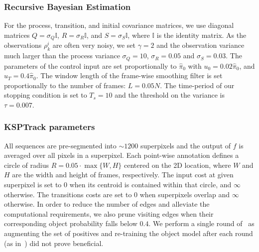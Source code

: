 \subsubsection{Recursive Bayesian Estimation}
For the process, transition, and initial covariance matrices, we use diagonal matrices 
$Q=\sigma_{Q}\mathbb{I}$, $R=\sigma_{R}\mathbb{I}$, and $S=\sigma_{S}\mathbb{I}$, where $\mathbb{I}$ is the identity matrix.
As the observations $\rho_{k}^{i}$ are often very noisy, we set $\gamma=2$ and the observation variance much larger than the process variance $\sigma_{Q}=10$, $\sigma_{R}=0.05$ and $\sigma_{S}=0.03$.
The parameters of the control input are set proportionally to $\hat \pi_{0}$ with $u_{0}=0.02 \hat \pi_{0}$, and $u_{T}=0.4 \hat \pi_{0}$. The window length of the frame-wise smoothing filter is set proportionally to the number of frames: $L=0.05N$. The time-period of our stopping condition is set to $T_{s}=10$ and the threshold on the variance is $\tau=0.007$.

\subsubsection{KSPTrack parameters}
\label{sec:org4560526}
All sequences are pre-segmented into $\sim 1200$ superpixels and the output of $f$ is averaged over all pixels in a superpixel. Each point-wise annotation defines a circle of radius \(R=0.05 \cdot \max\{W,H\}\) centered on the 2D location, where \(W\) and \(H\) are the width and height of frames, respectively. The input cost at given superpixel is set to $0$ when its centroid is contained within that circle, and $\infty$ otherwise. The transitions costs are set to $0$ when superpixels overlap and $\infty$ otherwise.
In order to reduce the number of edges and alleviate the computational requirements, we also prune {visiting} edges when their corresponding object probability falls below $0.4$. We perform a single round of \KSPTrack~as augmenting the set of positives and re-training the object model after each round (as in~\cite{lejeune18}) did not prove beneficial.

